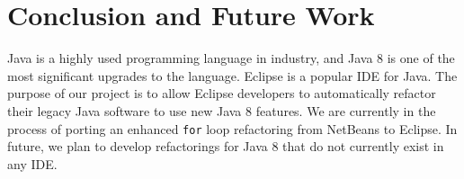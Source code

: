 \section{Conclusion and Future Work}

Java is a highly used programming language in industry, and Java 8 is one of
the most significant upgrades to the language. Eclipse is a popular IDE for
Java. The purpose of our project is to allow Eclipse developers to
automatically refactor their legacy Java software to use new Java 8 features.
We are currently in the process of porting an enhanced \lstinline{for} loop
refactoring from NetBeans to Eclipse. In future, we plan to develop
refactorings for Java 8 that do not currently exist in any IDE\@.
